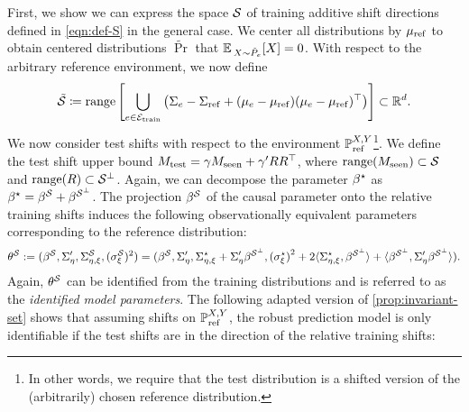First, we show we can express the space $\mathcal{S}$ of training additive shift directions defined in \cref{eqn:def-S} in the general case. We center all distributions by $\mu_{\mathrm{ref}}$  to obtain centered distributions $\tilde{\Pr}$ that $\mathbb{E}\,_{X\sim \tilde{P}_e}[X]=0$. With respect to the arbitrary reference environment, we now define
\begin{align*}
    \tilde{\mathcal{S}} \coloneqq \mathrm{range} \left[\bigcup_{e \in \mathcal{E}_{\mathrm{train}}} \left(\Sigma_e - \Sigma_{\mathrm{ref}} + (\mu_e - \mu_{\mathrm{ref}})(\mu_e - \mu_{\mathrm{ref}})^\top \right)\right]\subset \mathbb{R}^d.
\end{align*}
We now consider test shifts with respect to the environment $\mathbb{P}_{\mathrm{ref}}^{X,Y}$\footnote{In other words, we require that the test distribution is a shifted version of the (arbitrarily) chosen reference distribution.}. We define the test shift upper bound $M_{\mathrm{test}} = \gamma M_{\mathrm{seen}} + \gamma' R R^\top$, where $\mathrm{range}(M_{\mathrm{seen}}) \subset \mathcal{S}$ and $\mathrm{range}(R) \subset \mathcal{S}^\perp$. Again, we can decompose the parameter $\beta^{\star}$ as $\beta^{\star} = \beta^{\mathcal{S}} + \beta^{\mathcal{S}^\perp}$.
The projection $\beta^{\mathcal{S}}$ of the causal parameter onto the relative training shifts induces the following observationally equivalent parameters corresponding to the reference distribution:
\begin{align*}
    \theta^{\mathcal{S}} := (\beta^{\mathcal{S}}, \Sigma_{\eta}', \Sigma^{\mathcal{S}}_{\eta,\xi}, ({\sigma_\xi^{\mathcal{S}}})^2) = (\beta^{\mathcal{S}}, \Sigma_{\eta}', \Sigma^\star_{\eta,\xi} + \Sigma_{\eta}' \beta^{\mathcal{S}^\perp}, {(\sigma_\xi^\star)}^2 + 2 \langle \Sigma^\star_{\eta,\xi}, \beta^{\mathcal{S}^\perp}\rangle + \langle \beta^{\mathcal{S}^\perp}, \Sigma_{\eta}' \beta^{\mathcal{S}^\perp}\rangle).
\end{align*}
Again, $\theta^{\mathcal{S}}$ can be identified from the training distributions and is referred to as the \emph{identified model parameters}. The following adapted version of \cref{prop:invariant-set} shows that assuming shifts on $\mathbb{P}_{\mathrm{ref}}^{X,Y}$, the robust prediction model is only identifiable if the test shifts are in the direction of the relative training shifts:
